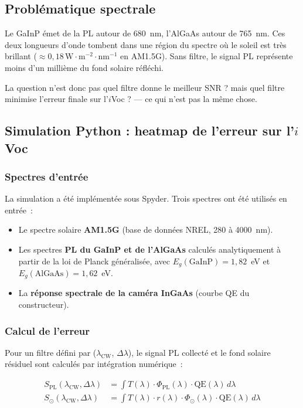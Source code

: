 \documentclass[12pt,a4paper]{report}
\begin{document}
\subsection{Problématique spectrale}

Le GaInP émet de la PL autour de 680~nm, l'AlGaAs autour de 765~nm. Ces deux longueurs d'onde tombent dans une région du spectre où le soleil est très brillant ($\approx 0{,}18\,\text{W}\cdot\text{m}^{-2}\cdot\text{nm}^{-1}$ en AM1.5G). Sans filtre, le signal PL représente moins d'un millième du fond solaire réfléchi.

La question n'est donc pas \og quel filtre donne le meilleur SNR ? \fg{} mais \og quel filtre minimise l'erreur finale sur l'$i$Voc ? \fg{} --- ce qui n'est pas la même chose.

\subsection{Simulation Python : heatmap de l'erreur sur l'$i$Voc}

\subsubsection{Spectres d'entrée}

La simulation a été implémentée sous Spyder. Trois spectres ont été utilisés en entrée~:
\begin{itemize}
  \item Le spectre solaire \textbf{AM1.5G} (base de données NREL, 280 à 4000~nm).
  \item Les spectres \textbf{PL du GaInP et de l'AlGaAs} calculés analytiquement à partir de la loi de Planck généralisée, avec $E_g(\text{GaInP}) = 1{,}82$~eV et $E_g(\text{AlGaAs}) = 1{,}62$~eV.
  \item La \textbf{réponse spectrale de la caméra InGaAs} (courbe QE du constructeur).
\end{itemize}

\subsubsection{Calcul de l'erreur}

Pour un filtre défini par ($\lambda_\text{CW}$, $\Delta\lambda$), le signal PL collecté et le fond solaire résiduel sont calculés par intégration numérique~:

\begin{align}
S_\text{PL}(\lambda_\text{CW},\Delta\lambda) &= \int T(\lambda)\cdot\Phi_\text{PL}(\lambda)\cdot\text{QE}(\lambda)\,d\lambda \\
S_\odot(\lambda_\text{CW},\Delta\lambda) &= \int T(\lambda)\cdot r(\lambda)\cdot\Phi_\odot(\lambda)\cdot\text{QE}(\lambda)\,d\lambda
\end{align}
\end{document}

